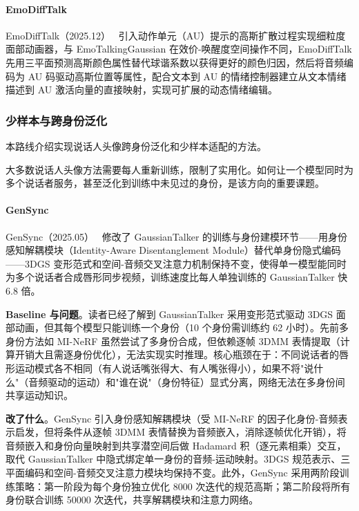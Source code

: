 \paragraph{EmoDiffTalk}

EmoDiffTalk（2025.12）~\cite{2512_05991} 引入动作单元（AU）提示的高斯扩散过程实现细粒度面部动画器，与 EmoTalkingGaussian 在效价-唤醒度空间操作不同，EmoDiffTalk 先用三平面预测高斯颜色属性替代球谐系数以获得更好的颜色归因，然后将音频编码为 AU 码驱动高斯位置等属性，配合文本到 AU 的情绪控制器建立从文本情绪描述到 AU 激活向量的直接映射，实现可扩展的动态情绪编辑。

\subsubsection{少样本与跨身份泛化}

本路线介绍实现说话人头像跨身份泛化和少样本适配的方法。

大多数说话人头像方法需要每人重新训练，限制了实用化。如何让一个模型同时为多个说话者服务，甚至泛化到训练中未见过的身份，是该方向的重要课题。

\paragraph{GenSync}

GenSync（2025.05）~\cite{2505_01928} 修改了 GaussianTalker 的训练与身份建模环节——用身份感知解耦模块（Identity-Aware Disentanglement Module）替代单身份隐式编码——3DGS 变形范式和空间-音频交叉注意力机制保持不变，使得单一模型能同时为多个说话者合成唇形同步视频，训练速度比每人单独训练的 GaussianTalker 快 6.8 倍。

\textbf{Baseline 与问题}。读者已经了解到 GaussianTalker 采用变形范式驱动 3DGS 面部动画，但其每个模型只能训练一个身份（10 个身份需训练约 62 小时）。先前多身份方法如 MI-NeRF 虽然尝试了多身份合成，但依赖逐帧 3DMM 表情提取（计算开销大且需逐身份优化），无法实现实时推理。核心瓶颈在于：不同说话者的唇形运动模式各不相同（有人说话嘴张得大、有人嘴张得小），如果不将"说什么"（音频驱动的运动）和"谁在说"（身份特征）显式分离，网络无法在多身份间共享运动知识。

\textbf{改了什么}。GenSync 引入身份感知解耦模块（受 MI-NeRF 的因子化身份-音频表示启发，但将条件从逐帧 3DMM 表情替换为音频嵌入，消除逐帧优化开销），将音频嵌入和身份向量映射到共享潜空间后做 Hadamard 积（逐元素相乘）交互，取代 GaussianTalker 中隐式绑定单一身份的音频-运动映射。3DGS 规范表示、三平面编码和空间-音频交叉注意力模块均保持不变。此外，GenSync 采用两阶段训练策略：第一阶段为每个身份独立优化 8000 次迭代的规范高斯；第二阶段将所有身份联合训练 50000 次迭代，共享解耦模块和注意力网络。

